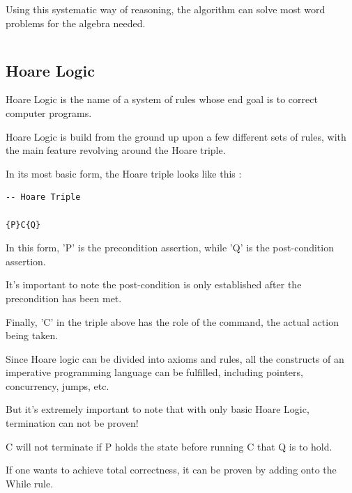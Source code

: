 \documentclass{article}
\begin{document}
\medskip\noindent
Using this systematic way of reasoning, the algorithm can solve most word problems for the algebra needed.

\medskip\medskip
\begin{lstlisting}
\end{lstlisting}

\medskip

\subsection{Hoare Logic}
\medskip\medskip
\hspace{\parindent} 

Hoare Logic is the name of a system of rules whose end goal is to correct computer programs. 

\medskip\noindent
Hoare Logic is build from the ground up upon a few different sets of rules, with the main feature revolving around the Hoare triple.

\medskip\noindent
In its most basic form, the Hoare triple looks like this \cite{HL}:

\medskip\medskip
\begin{lstlisting}
-- Hoare Triple

{P}C{Q}
\end{lstlisting}

\medskip\noindent
In this form, 'P' is the precondition assertion, while 'Q' is the post-condition assertion. 

\medskip\noindent
It's important to note the post-condition is only established after the precondition has been met.

\medskip\noindent
Finally, 'C' in the triple above has the role of the command, the actual action being taken. 

\medskip\noindent
Since Hoare logic can be divided into axioms and rules, all the constructs of an imperative programming language can be fulfilled, including pointers, concurrency, jumps, etc. 

\medskip\noindent
But it's extremely important to note that with only basic Hoare Logic, termination can not be proven!

\medskip\noindent
C will not terminate if P holds the state before running C that Q is to hold.

\medskip\noindent
If one wants to achieve total correctness, it can be proven by adding onto the While rule.

\medskip\medskip
\begin{lstlisting}
\end{lstlisting}
\end{document}
